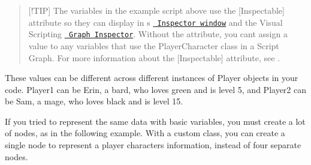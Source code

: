 \begin{DoxyCode}{0}
\DoxyCodeLine{}
\DoxyCodeLine{\{}
\DoxyCodeLine{\ \ \ \ [Inspectable]}
\DoxyCodeLine{\ \ \ \ [Inspectable]}
\DoxyCodeLine{\ \ \ \ [Inspectable]}
\DoxyCodeLine{\ \ \ \ [Inspectable]}
\DoxyCodeLine{\}}

\end{DoxyCode}
 \begin{quote}
\mbox{[}!\+TIP\mbox{]} The variables in the example script above use the {\ttfamily \mbox{[}Inspectable\mbox{]}} attribute so they can display in \textquotesingle{}s \href{https://docs.unity3d.com/Manual/UsingTheInspector.html}{\texttt{ Inspector window}} and the Visual Scripting \href{vs-interface-overview.md\#the-graph-inspector}{\texttt{ Graph Inspector}}. Without the attribute, you can\textquotesingle{}t assign a value to any variables that use the {\ttfamily Player\+Character} class in a Script Graph. For more information about the {\ttfamily \mbox{[}Inspectable\mbox{]}} attribute, see . \end{quote}
These values can be different across different instances of {\ttfamily Player} objects in your code. {\ttfamily Player1} can be Erin, a bard, who loves green and is level 5, and {\ttfamily Player2} can be Sam, a mage, who loves black and is level 15.



If you tried to represent the same data with basic variables, you must create a lot of nodes, as in the following example. With a custom class, you can create a single node to represent a player character\textquotesingle{}s information, instead of four separate nodes.

 
